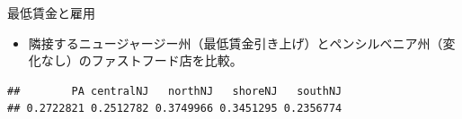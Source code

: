 \documentclass[
  ignorenonframetext,
]{beamer}
\newenvironment{Shaded}{\begin{snugshade}}{\end{snugshade}}
\newcommand{\CommentTok}[1]{\textcolor[rgb]{0.56,0.35,0.01}{\textit{#1}}}
\newcommand{\FunctionTok}[1]{\textcolor[rgb]{0.00,0.00,0.00}{#1}}
\newcommand{\NormalTok}[1]{#1}
\newcommand{\OtherTok}[1]{\textcolor[rgb]{0.56,0.35,0.01}{#1}}
\newcommand{\SpecialCharTok}[1]{\textcolor[rgb]{0.00,0.00,0.00}{#1}}
\newcommand{\StringTok}[1]{\textcolor[rgb]{0.31,0.60,0.02}{#1}}
\providecommand{\tightlist}{%
  \setlength{\itemsep}{0pt}\setlength{\parskip}{0pt}}
\begin{document}
\begin{frame}[fragile]{最低賃金と雇用}
\protect\hypertarget{ux6700ux4f4eux8cc3ux91d1ux3068ux96c7ux7528}{}
\begin{itemize}
\tightlist
\item
  隣接するニュージャージー州（最低賃金引き上げ）とペンシルベニア州（変化なし）のファストフード店を比較。
\end{itemize}

\begin{Shaded}
\end{Shaded}

\begin{verbatim}
##        PA centralNJ   northNJ   shoreNJ   southNJ 
## 0.2722821 0.2512782 0.3749966 0.3451295 0.2356774
\end{verbatim}
\end{frame}
\end{document}
